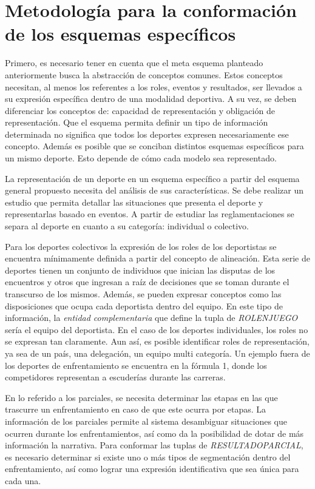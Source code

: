 
\section{Metodología para la conformación de los esquemas específicos}

    Primero, es necesario tener en cuenta que el meta esquema planteado anteriormente busca la abstracción de conceptos comunes. Estos 
conceptos necesitan, al menos los referentes a los roles, eventos y resultados, ser llevados a su expresión específica dentro de una modalidad 
deportiva. A su vez, se deben diferenciar los conceptos de: capacidad de representación y obligación de representación. Que el esquema permita definir 
un tipo de información determinada no significa que todos los deportes expresen necesariamente ese concepto. Además es posible que se conciban distintos 
esquemas específicos para un mismo deporte. Esto depende de cómo cada modelo sea representado.

    La representación de un deporte en un esquema específico a partir del esquema general propuesto necesita del análisis de sus características. 
Se debe realizar un estudio que permita detallar las situaciones que presenta el deporte y representarlas basado en eventos. A partir de 
estudiar las reglamentaciones se separa al deporte en cuanto a su categoría: individual o colectivo. 

    Para los deportes colectivos la expresión de los roles de los deportistas se encuentra mínimamente definida a partir del concepto de 
alineación. Esta serie de deportes tienen un conjunto de individuos que inician las disputas de los encuentros y otros que ingresan a raíz de decisiones 
que se toman durante el transcurso de los mismos. Además, se pueden expresar conceptos como las disposiciones que ocupa cada deportista dentro del equipo. En este 
tipo de información, la \textit{entidad complementaria} que define la tupla de \textit{ROLENJUEGO} sería el equipo del deportista.
    En el caso de los deportes individuales, los roles no se expresan tan claramente. Aun así, es posible identificar roles de representación, ya sea de un 
país, una delegación, un equipo multi categoría. Un ejemplo fuera de los deportes de enfrentamiento se encuentra en la fórmula 1, donde los competidores 
representan a escuderías durante las carreras.

    En lo referido a los parciales, se necesita determinar las etapas en las que trascurre un enfrentamiento en caso de que este ocurra por etapas. La información 
de los parciales permite al sistema desambiguar situaciones que ocurren durante los enfrentamientos, así como da la posibilidad de dotar de más información 
la narrativa. Para conformar las tuplas de \textit{RESULTADOPARCIAL}, es necesario determinar si existe uno o m\'as tipos de segmentación dentro del enfrentamiento, así como 
lograr una expresión identificativa que sea única para cada una.

